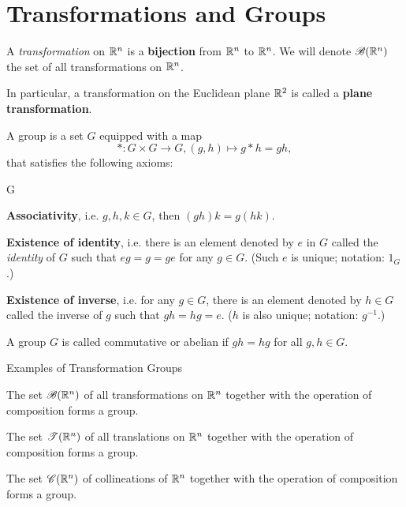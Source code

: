 \section{Transformations and Groups}

\begin{definition}
    A \textit{transformation} on \(\mathbb{R}^n\) is a \textbf{bijection} from \(\mathbb{R}^n\) to \(\mathbb{R}^n\). We will denote \(\mathscr{B}(\mathbb{R}^n)\) the set of all transformations on \(\mathbb{R}^n\).

    In particular, a transformation on the Euclidean plane \(\mathbb{R}^2\) is called a \textbf{plane transformation}.
\end{definition}

\begin{definition}[Group]
    A group is a set \(G\) equipped with a map
    \[* : G \times G \to G, (g, h) \mapsto g * h = gh,\]
    that satisfies the following axioms:
    \begin{statements}{G}
        \item \label{item:G1} \textbf{Associativity}, i.e. \(g, h, k \in G\), then \((gh)k = g(hk)\).
        \item \textbf{Existence of identity}, i.e. there is an element denoted by \(e\) in \(G\) called the \textit{identity} of \(G\) such that \(eg = g = ge\) for any \(g \in G.\) (Such \(e\) is unique; notation: \(1_G\).)
        \item \textbf{Existence of inverse}, i.e. for any \(g \in G\), there is an element denoted by \(h \in G\) called the inverse of \(g\) such that \(gh = hg = e\). (\(h\) is also unique; notation: \(g^{-1}\).)
    \end{statements}
    A group \(G\) is called commutative or abelian if \(gh = hg\) for all \(g, h \in G\).
\end{definition}

\begin{proposition}
    Examples of Transformation Groups
    \begin{statements}{}
        \item The set \(\mathscr{B}(\mathbb{R}^n)\) of all transformations on \(\mathbb{R}^n\) together with the operation of composition forms a group.
        \item The set \(\mathscr{T}(\mathbb{R}^n)\) of all translations on \(\mathbb{R}^n\) together with the operation of composition forms a group.
        \item The set \(\mathscr{C}(\mathbb{R}^n)\) of collineations of \(\mathbb{R}^n\) together with the operation of composition forms a group.
    \end{statements}
\end{proposition}

